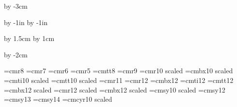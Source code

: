 











%


\enablehyperlinks[dvipdfm]


\hsize=210mm
\vsize=297mm

\parindent=0pt

\advance\vsize by -3cm

\advance\voffset by -1in
\advance\hoffset by -1in

\advance\voffset by 1.5cm
\advance\hoffset by 1cm

\advance\hsize by -2cm


{}

\font\small=cmr8
\font\Small=cmr7
\font\SMALL=cmr6
\font\tiny=cmr5
\font\smalltt=cmtt8
\font\rmnine=cmr9
\font\medium=cmr10 scaled \magstephalf
\font\mediumbx=cmbx10 scaled \magstephalf
\font\mediumit=cmti10 scaled \magstephalf
\font\mediumtt=cmtt10 scaled \magstephalf
\font\Medium=cmr11
\font\large=cmr12
\font\largebx=cmbx12
\font\largeit=cmti12
\font\largett=cmtt12
\font\Largebx=cmbx12 scaled \magstephalf
\font\huge=cmr12 scaled 
\font\hugebx=cmbx12 scaled 
\font\mediumsy=cmsy10 scaled \magstephalf
\font\largesy=cmsy12
\font\Largesy=cmsy13
\font\LARGEsy=cmsy14 
\font\mediumcy=cmcyr10 scaled \magstephalf


